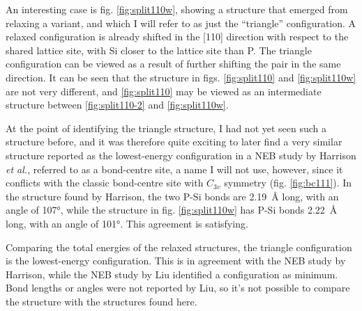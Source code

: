 \documentclass[11pt,bibliography=totoc,index=totoc]{scrbook}   %
\begin{document}
An interesting case is fig. \ref{fig:split110w}, showing a structure that emerged from relaxing 
a  variant, and which I will refer to as just the ``triangle'' configuration.
A relaxed  configuration is already shifted in the [110] direction with respect to the shared lattice site,
with Si closer to the lattice site than P. 
The triangle configuration can be viewed as a result of further shifting the pair in the same direction. 
It can be seen that the structure in figs. \ref{fig:split110} and \ref{fig:split110w} are not very different, 
and \ref{fig:split110} may be viewed as an intermediate structure between \ref{fig:split110-2} and \ref{fig:split110w}.

At the point of identifying the triangle structure, I had not yet seen such a structure before,
and it was therefore quite exciting to later find a very similar structure reported as 
the lowest-energy configuration in a NEB study by Harrison \textit{et al.}, referred to as a bond-centre site,\cite{Harrison:2006}
a name I will not use, however, since it conflicts with the classic bond-centre site with $C_{3v}$ symmetry (fig. \ref{fig:bc111}).
In the structure found by Harrison, 
the two P-Si bonds are 2.19~Å long, with an angle of \ang{107}, 
while the structure in fig. \ref{fig:split110w} has P-Si bonds 2.22~Å long, with an angle of \ang{101}.
This agreement is satisfying.

Comparing the total energies of the relaxed structures, the triangle configuration is the lowest-energy configuration.
This is in agreement with the NEB study by Harrison,\cite{Harrison:2006}
while the NEB study by Liu\cite{Liu:2003} identified a  configuration as minimum.
Bond lengths or angles were not reported by Liu, so it's not possible to compare the structure with
the structures found here.


\end{document}
